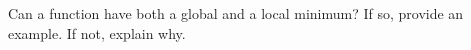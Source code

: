 
Can a function have both a global and a local minimum? If so, provide
an example. If not, explain why.
